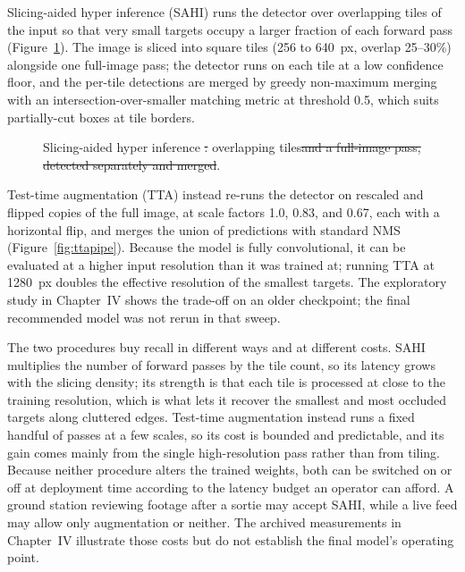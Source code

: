 \documentclass[12pt,a4paper,oneside]{report}
\providecommand{\DIFadd}[1]{{\protect\color{blue}\uwave{#1}}} %
\providecommand{\DIFdel}[1]{{\protect\color{red}\sout{#1}}}                      %
\providecommand{\DIFaddFL}[1]{\DIFadd{#1}} %
\providecommand{\DIFdelFL}[1]{\DIFdel{#1}} %
\providecommand{\DIFaddbeginFL}{} %
\providecommand{\DIFaddendFL}{} %
\providecommand{\DIFdelbeginFL}{} %
\providecommand{\DIFdelendFL}{} %
\begin{document}
Slicing-aided hyper inference (SAHI) runs the detector over overlapping tiles of
the input so that very small targets occupy a larger fraction of each forward
pass (Figure~\ref{fig:sahipipe}). The image is sliced into square tiles (256 to
640~px, overlap 25--30\%) alongside one full-image pass; the detector runs on
each tile at a low confidence floor, and the per-tile detections are merged by
greedy non-maximum merging with an intersection-over-smaller matching metric at
threshold 0.5, which suits partially-cut boxes at tile borders.

\begin{figure}[tbp]
  \centering
  \DIFdelbeginFL %
\DIFdelendFL \DIFaddbeginFL \caption{\DIFaddendFL Slicing-aided hyper inference \DIFdelbeginFL \DIFdelFL{:
  }\DIFdelendFL \DIFaddbeginFL \DIFaddFL{on }\DIFaddendFL overlapping tiles\DIFdelbeginFL \DIFdelFL{and a full-image pass, detected separately and merged}\DIFdelendFL .}
  \label{fig:sahipipe}
\end{figure}

Test-time augmentation (TTA) instead re-runs the detector on rescaled and
flipped copies of the full image, at scale factors 1.0, 0.83, and 0.67, each
with a horizontal flip, and merges the union of predictions with standard NMS
(Figure~\ref{fig:ttapipe}). Because the model is fully convolutional, it can be
evaluated at a higher input resolution than it was trained at; running TTA at
1280~px doubles the effective resolution of the smallest targets. The
exploratory study in Chapter~IV shows the trade-off on an older checkpoint;
the final recommended model was not rerun in that sweep.

The two procedures buy recall in different ways and at different costs. SAHI
multiplies the number of forward passes by the tile count, so its latency grows
with the slicing density; its strength is that each tile is processed at close
to the training resolution, which is what lets it recover the smallest and most
occluded targets along cluttered edges. Test-time augmentation instead runs a
fixed handful of passes at a few scales, so its cost is bounded and predictable,
and its gain comes mainly from the single high-resolution pass rather than from
tiling. Because neither procedure alters the trained weights, both can be
switched on or off at deployment time according to the latency budget an
operator can afford. A ground station reviewing footage after a sortie may
accept SAHI, while a live feed may allow only augmentation or neither. The
archived measurements in Chapter~IV illustrate those costs but do not establish
the final model's operating point.
\end{document}
